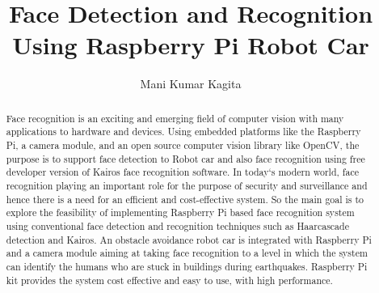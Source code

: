 % 


\def\paperstatus{100} %
\def\paperchapter{Edge Computing} %
\def\hid{hid-sp18-711} %
\def\volume{10} %

\def\locator{%
	\hid, Volume: \volume, Chapter: \paperchapter, Status: \paperstatus. \newline}


\title{Face Detection and Recognition Using Raspberry Pi Robot Car}

\author{Mani Kumar Kagita}

\renewcommand{\shortauthors}{Mani Kumar Kagita}

\begin{abstract}
Face recognition is an exciting and emerging field of computer vision with 
many applications to hardware and devices. Using embedded platforms like 
the Raspberry Pi, a camera module, and an open source computer vision 
library like OpenCV, the purpose is to support face detection to Robot car 
and also face recognition using free developer version of Kairos face 
recognition software.
In today`s modern world, face recognition playing an important role for the 
purpose of security and surveillance and hence there is a need for an 
efficient and cost-effective system. So the main goal is to explore the 
feasibility of implementing Raspberry Pi based face recognition system using 
conventional face detection and recognition techniques such as Haarcascade 
detection and Kairos. An obstacle avoidance robot car is integrated with 
Raspberry Pi and a camera module aiming at taking face recognition to a level 
in which the system can identify the humans who are stuck in buildings during 
earthquakes. Raspberry Pi kit provides the system cost effective and easy to 
use, with high performance.

\end{abstract}



